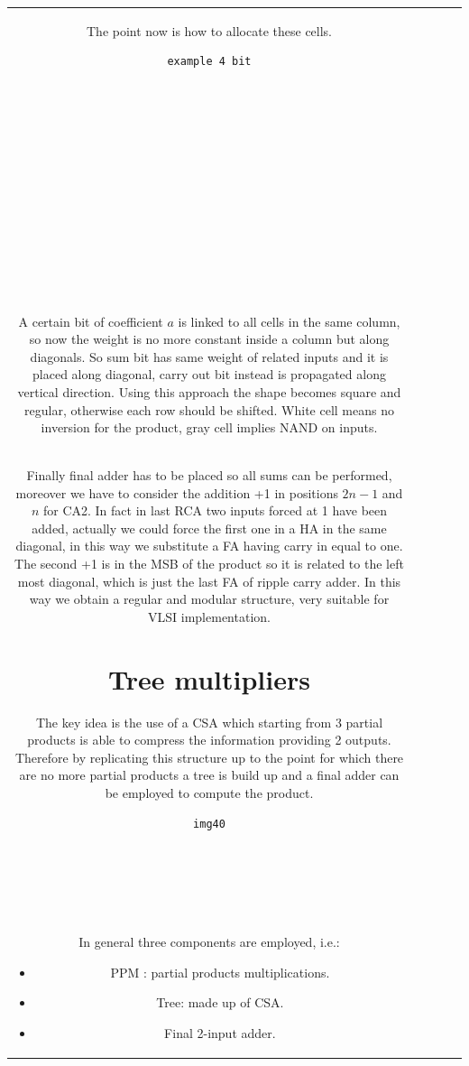 \begin{center}
\begin{tabular}{|c|c|c|c|c|}
The point now is how to allocate these cells.

\begin{verbatim}
example 4 bit














\end{verbatim}

A certain bit of coefficient $a$ is linked to all cells in the same column, so now the weight is no more constant inside a column but along diagonals. So sum bit has same weight of related inputs and it is placed along diagonal, carry out bit instead is propagated along vertical direction.
Using this approach the shape becomes square and regular, otherwise each row should be shifted. White cell means no inversion for the product, gray cell implies NAND on inputs.\\

Finally final adder has to be placed so all sums can be performed, moreover we have to consider the addition +1 in positions $2n-1$ and $n$ for CA2. In fact in last RCA two inputs forced at 1 have been added, actually we could force the first one in a HA in the same diagonal, in this way we substitute a FA having carry in equal to one. The second +1 is in the MSB of the product so it is related to the left most diagonal, which is just the last FA of ripple carry adder. In this way we obtain a regular and modular structure, very suitable for VLSI implementation.

\section{Tree multipliers}
The key idea is the use of a CSA which starting from 3 partial products is able to compress the information providing 2 outputs. Therefore by replicating this structure up to the point for which there are no more partial products a tree is build up and a final adder can be employed to compute the product.
\begin{verbatim}
img40






\end{verbatim}

In general three components are employed, i.e.:
\begin{itemize}
  \item PPM : partial products multiplications.
  \item Tree: made up of CSA.
  \item Final 2-input adder.
\end{itemize}


\end{tabular}
\end{center}
